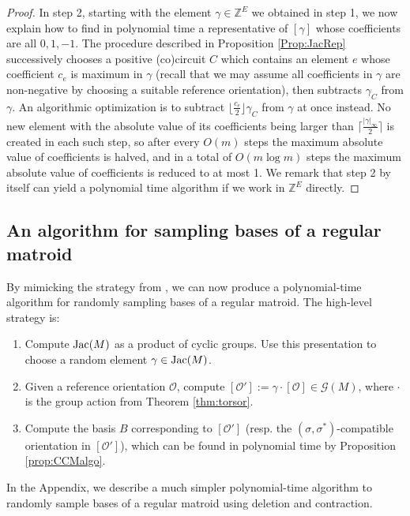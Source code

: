 \documentclass[12pt]{amsart}
\numberwithin{equation}{section}
\theoremstyle{definition}
\begin{document}
\begin{proof}
In step 2, starting with the element $\gamma\in \mathbb{Z}^E$ we obtained in step 1, we now explain how to find in polynomial time a representative of $[\gamma]$ whose coefficients are all $0,1,-1$. 
The procedure described in Proposition \ref{Prop:JacRep} successively chooses a positive (co)circuit $C$ which contains an element $e$ whose coefficient $c_e$ is maximum in $\gamma$ (recall that we may assume all coefficients in $\gamma$ are non-negative by choosing a suitable reference orientation), then subtracts $\gamma_C$ from $\gamma$. An algorithmic optimization is to subtract $\lfloor\frac{c_e}{2}\rfloor\gamma_C$ from $\gamma$ at once instead. No new element with the absolute value of its coefficients being larger than $\lceil\frac{|\gamma|_\infty}{2}\rceil$ is created in each such step, so after every $O(m)$ steps the maximum absolute value of coefficients is halved, and in a total of $O(m\log m)$ steps the maximum absolute value of coefficients is reduced to at most 1. We remark that step 2 by itself can yield a polynomial time algorithm if we work in $\mathbb{Z}^E$ directly.
\end{proof}

\subsection{An algorithm for sampling bases of a regular matroid} \label{sec:sam_algo}

By mimicking the strategy from \cite{baker2013chip}, we can now produce a polynomial-time algorithm for randomly sampling bases of a regular matroid.  The high-level strategy is:
\begin{enumerate}
\item Compute ${\rm Jac}(M)$ as a product of cyclic groups.  Use this presentation to choose a random element $\gamma \in {\rm Jac}(M)$.
\item Given a reference orientation ${\mathcal O}$, compute $[{\mathcal O}'] := \gamma \cdot [{\mathcal O}] \in {\mathcal G}(M)$, where $\cdot$ is the group action from Theorem \ref{thm:torsor}.
\item Compute the basis $B$ corresponding to $[{\mathcal O}']$ (resp. the $(\sigma,\sigma^*)$-compatible orientation in $[\mathcal{O}']$), which can be found in polynomial time by Proposition \ref{prop:CCMalgo}.
\end{enumerate}


In the Appendix, we describe a much simpler polynomial-time algorithm to randomly sample bases of a regular matroid using deletion and contraction.
\end{document}
